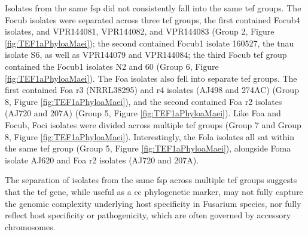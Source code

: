 Isolates from the same \ac{fsp} did not consistently fall into the same \ac{tef} groups. The \ac{Focub} isolates were separated across three \ac{tef} groups, the first 
contained \ac{Focub4} isolates, and VPR144081, VPR144082, and VPR144083 (Group 2, Figure \ref{fig:TEF1aPhyloaMaei}); the second contained \ac{Focub1} isolate 160527, the \ac{tnau} isolate S6, as well as VPR144079 and VPR144084; the third \ac{Focub} \ac{tef} group contained the \ac{Focub1} isolates N2 and 60 (Group 6, Figure \ref{fig:TEF1aPhyloaMaei}). The \ac{Foa} isolates also fell into separate \ac{tef} groups. The first contained \ac{Foa} \ac{r3} (NRRL38295) and \ac{r4} isolates (AJ498 and 274AC) (Group 8, Figure \ref{fig:TEF1aPhyloaMaei}), and the second contained \ac{Foa} \ac{r2} isolates (AJ720 and 207A) (Group 5, Figure \ref{fig:TEF1aPhyloaMaei}). Like \ac{Foa} and \ac{Focub}, \ac{Foci} isolates were divided across multiple \ac{tef} groups (Group 7 and Group 8, Figure \ref{fig:TEF1aPhyloaMaei}). Interestingly, the \ac{Fola} isolates all sat within the same \ac{tef} group (Group 5, Figure \ref{fig:TEF1aPhyloaMaei}), alongside \ac{Foma} isolate AJ620 and \ac{Foa} \ac{r2} isolates (AJ720 and 207A). 

The separation of isolates from the same \ac{fsp} across multiple \ac{tef} groups suggests that the \ac{tef} gene, while useful as a \ac{cc} phylogenetic marker, may not fully capture the genomic complexity underlying host specificity in Fusarium species, nor fully reflect host specificity or pathogenicity, which are often governed by accessory chromosomes. 


